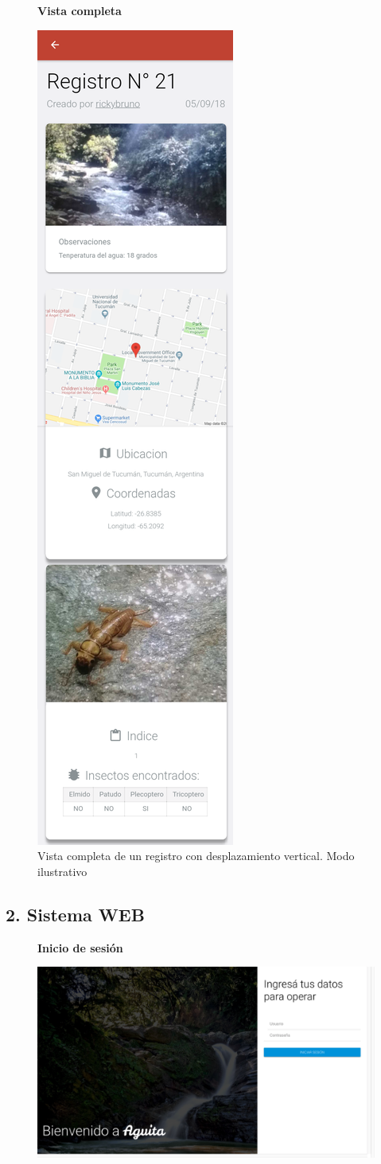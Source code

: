 				\begin{figure}[H]
					\centering
					\textbf{Vista completa}\par\medskip
						\includegraphics[height=1.2\textwidth]{Screenshots/verRegistroCompleto.png}
						\caption{Vista completa de un registro con desplazamiento vertical. Modo ilustrativo}
				\end{figure}

			\subsection{2. Sistema WEB}

				\begin{figure}[H]
					\hspace*{1cm}\raggedright\large\textbf{Inicio de sesión}\par\medskip
					\centering
						\includegraphics[width=1\textwidth]{Screenshots/web/login.png}
				\end{figure} 
	
